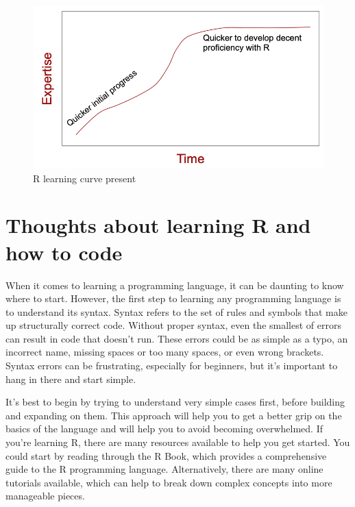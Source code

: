 \documentclass[
]{book}
\begin{document}
\begin{figure}

{\centering \includegraphics[width=11.21in]{images/01_002_r_learning_curve_present} 

}

\caption{\label{fig:1002}R learning curve present}\label{fig:1002}
\end{figure}

\hypertarget{thoughts-about-learning-r-and-how-to-code}{%
\section*{Thoughts about learning R and how to code}\label{thoughts-about-learning-r-and-how-to-code}}

When it comes to learning a programming language, it can be daunting to know where to start. However, the first step to learning any programming language is to understand its syntax. Syntax refers to the set of rules and symbols that make up structurally correct code. Without proper syntax, even the smallest of errors can result in code that doesn't run. These errors could be as simple as a typo, an incorrect name, missing spaces or too many spaces, or even wrong brackets. Syntax errors can be frustrating, especially for beginners, but it's important to hang in there and start simple.

It's best to begin by trying to understand very simple cases first, before building and expanding on them. This approach will help you to get a better grip on the basics of the language and will help you to avoid becoming overwhelmed. If you're learning R, there are many resources available to help you get started. You could start by reading through the R Book, which provides a comprehensive guide to the R programming language. Alternatively, there are many online tutorials available, which can help to break down complex concepts into more manageable pieces.
\end{document}
